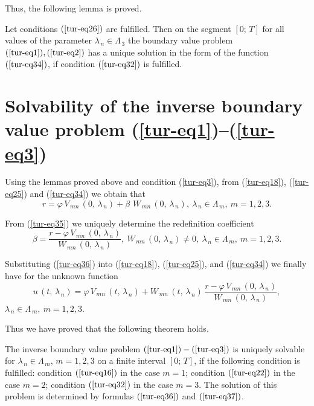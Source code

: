 ﻿\documentclass[
11pt,%
tightenlines,%
twoside,%
onecolumn,%
nofloats,%
nobibnotes,%
nofootinbib,%
superscriptaddress,%
noshowpacs,%
centertags]%
{revtex4}
\begin{document}
Thus, the following lemma is proved.

\begin{lemma} Let conditions $(\ref{tur-eq26})$ are fulfilled. Then on the segment $[0 ; \, T]$ for all values of the parameter $\lambda_{\, n} \in \Lambda_{\, 3}$ the boundary value problem  $(\ref{tur-eq1}), (\ref{tur-eq2})$ has a unique solution in the form of the function $(\ref{tur-eq34})$, if condition $(\ref{tur-eq32})$ is fulfilled.
\end{lemma}

\section{Solvability of the inverse boundary value problem (\ref{tur-eq1})--(\ref{tur-eq3})}

 Using the lemmas proved above and condition (\ref{tur-eq3}), from (\ref{tur-eq18}), (\ref{tur-eq25}) and (\ref{tur-eq34}) we obtain that
\begin{equation} \label{tur-eq35}
r=\varphi \, V_{\, m n} \, (0 , \, \lambda_{\, n})+
\beta \,  \, W_{\, m n} \, (0 , \, \lambda_{\, n}) , \: \lambda_{\, n} \in \Lambda_{\, m} , \: m=1 , 2 , 3 .
\end{equation}
                     
	From (\ref{tur-eq35}) we uniquely determine the redefinition coefficient
\begin{equation} \label{tur-eq36}
\beta=\dfrac{r-\varphi \, V_{\, m n} \, (0 , \, \lambda_{\, n})}{W_{\, m n} \, (0 , \, \lambda_{\, n})} , \: W_{\, m n} \, (0 , \, \lambda_{\, n}) \ne 0 , \: \lambda_{\, n} \in \Lambda_{\, m} , \: m=1 , 2 , 3 .
\end{equation}
                  
	Substituting (\ref{tur-eq36}) into (\ref{tur-eq18}), (\ref{tur-eq25}), and (\ref{tur-eq34}) we finally have for the unknown function
\begin{equation} \label{tur-eq37}
u \, (t , \, \lambda_{\, n})=\varphi \, V_{\, m n} \, (t , \, \lambda_{\, n})+
W_{\, m n} \, (t , \, \lambda_{\, n}) \, \dfrac{r-\varphi \, V_{\, m n} \, (0 , \, \lambda_{\, n})}{W_{\, m n} \, (0 , \, \lambda_{\, n})} ,
\end{equation}
$\lambda_{\, n} \in \Lambda_{\, m} , \: m=1 , 2 , 3$.
         
	Thus we have proved that the following theorem holds.
	
\begin{theorem} The inverse boundary value problem $(\ref{tur-eq1})-(\ref{tur-eq3})$ is uniquely solvable for $\lambda_{\, n} \in \Lambda_{\, m}$, $m=1 , 2 , 3 $ on a finite interval $[0 ; \, T]$, if the following condition is fulfilled: condition $(\ref{tur-eq16})$ in the case $m=1$; condition $(\ref{tur-eq22})$ in the case $m=2$; condition $(\ref{tur-eq32})$ in the case $m=3$. The solution of this problem is determined by formulas $(\ref{tur-eq36})$ and $(\ref{tur-eq37})$. 
\end{theorem}
\end{document}
